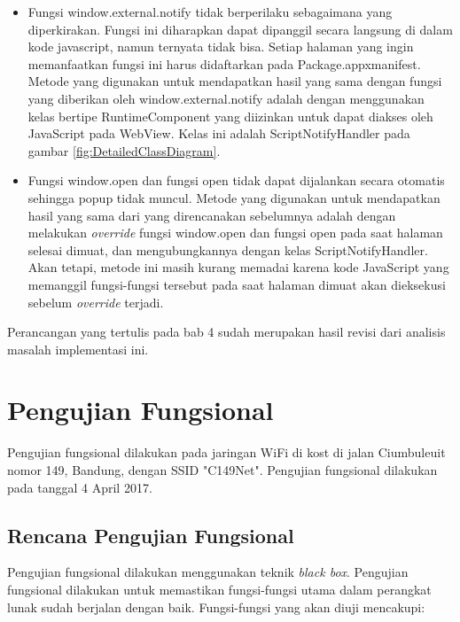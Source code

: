 \begin{itemize}
    \item{Fungsi window.external.notify tidak berperilaku sebagaimana yang diperkirakan. Fungsi ini diharapkan dapat dipanggil secara langsung di dalam kode javascript, namun ternyata tidak bisa. Setiap halaman yang ingin memanfaatkan fungsi ini harus didaftarkan pada Package.appxmanifest. Metode yang digunakan untuk mendapatkan hasil yang sama dengan fungsi yang diberikan oleh window.external.notify adalah dengan menggunakan kelas bertipe RuntimeComponent yang diizinkan untuk dapat diakses oleh JavaScript pada WebView. Kelas ini adalah ScriptNotifyHandler pada gambar \ref{fig:DetailedClassDiagram}.}
    \item{Fungsi window.open dan fungsi open tidak dapat dijalankan secara otomatis sehingga popup tidak muncul. Metode yang digunakan untuk mendapatkan hasil yang sama dari yang direncanakan sebelumnya adalah dengan melakukan \textit{override} fungsi window.open dan fungsi open pada saat halaman selesai dimuat, dan mengubungkannya dengan kelas ScriptNotifyHandler. Akan tetapi, metode ini masih kurang memadai karena kode JavaScript yang memanggil fungsi-fungsi tersebut pada saat halaman dimuat akan dieksekusi sebelum \textit{override} terjadi.}
\end{itemize}

Perancangan yang tertulis pada bab 4 sudah merupakan hasil revisi dari analisis masalah implementasi ini.



\section{Pengujian Fungsional}
\label{sec:pengujian_fungsional}

Pengujian fungsional dilakukan pada jaringan WiFi di kost di jalan Ciumbuleuit nomor 149, Bandung, dengan SSID "C149Net". Pengujian fungsional dilakukan pada tanggal 4 April 2017.

\subsection{Rencana Pengujian Fungsional}
\label{subsec:rencana_pengujian_fungsional}

Pengujian fungsional dilakukan menggunakan teknik \textit{black box}. Pengujian fungsional dilakukan untuk memastikan fungsi-fungsi utama dalam perangkat lunak sudah berjalan dengan baik. Fungsi-fungsi yang akan diuji mencakupi:

